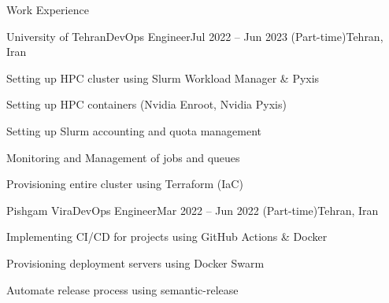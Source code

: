 \documentclass[]{main}
\begin{document}
\begin{section}{Work Experience}
 \begin{subsection}{University of Tehran}{DevOps Engineer}{Jul 2022 -- Jun 2023 (Part-time)}{Tehran, Iran}
     \item Setting up HPC cluster using Slurm Workload Manager \& Pyxis
     \item Setting up HPC containers (Nvidia Enroot, Nvidia Pyxis)
     \item Setting up Slurm accounting and quota management
     \item Monitoring and Management of jobs and queues
     \item Provisioning entire cluster using Terraform (IaC)
 \end{subsection}

 \begin{subsection}{Pishgam Vira}{DevOps Engineer}{Mar 2022 -- Jun 2022 (Part-time)}{Tehran, Iran}
     \item Implementing CI/CD for projects using GitHub Actions \& Docker
     \item Provisioning deployment servers using Docker Swarm
     \item Automate release process using semantic-release
 \end{subsection}
\end{section}

\end{document}
